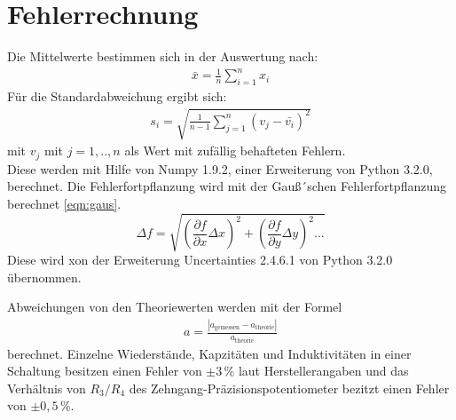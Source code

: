 \section{Fehlerrechnung}
Die Mittelwerte bestimmen sich in der Auswertung nach:
\begin{align}
  \bar{x}=\frac{1}{n} \sum_{i=1}^n x_i
\end{align}
Für die Standardabweichung ergibt sich:
\begin{align}
 s_i=\sqrt{\frac{1}{n-1}\sum_{j=1}^n (v_j-\bar{v_i})^2}
\end{align}
mit $v_j$ mit $j=1,..,n$ als Wert mit zufällig behafteten Fehlern.\\
Diese werden mit Hilfe von
Numpy 1.9.2, einer Erweiterung von Python 3.2.0, berechnet.
Die Fehlerfortpflanzung wird mit der Gauß´schen Fehlerfortpflanzung berechnet
 \eqref{eqn:gaus}.
\begin{equation}
\Delta f= \sqrt{\left(\frac{\partial f}{\partial x}\Delta x \right)^{2} + \left( \frac{\partial f}{\partial y}\Delta y\right)^2...}\label{eqn:gaus}
\end{equation}
Diese wird xon der Erweiterung Uncertainties 2.4.6.1 von Python 3.2.0 übernommen.

Abweichungen von den Theoriewerten werden mit der Formel
\begin{align}
  a=\frac{|a_\mathrm{gemessen}-a_\mathrm{theorie}|}{a_\mathrm{theorie}} \label{eqn:abweich}
\end{align}
berechnet.
Einzelne Wiederstände, Kapzitäten und  Induktivitäten in einer Schaltung
besitzen einen Fehler von $\pm3\,\si{\percent}$ laut Herstellerangaben und
das Verhältnis von $R_3/R_4$ des Zehngang-Präzisionspotentiometer bezitzt einen Fehler von $\pm0,5\,\si{\percent}$.
\newpage
